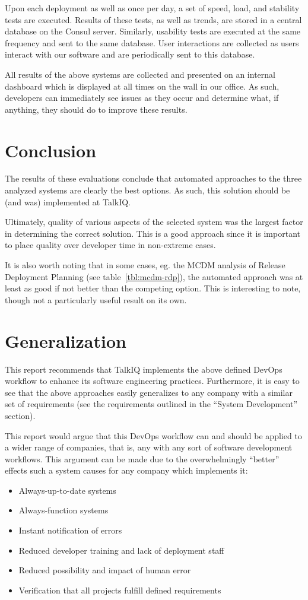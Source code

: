 \documentclass[12pt]{article}
\begin{document}
Upon each deployment as well as once per day, a set of speed, load, and stability tests are executed. Results of these tests, as well as trends, are stored in a central database on the Consul server. Similarly, usability tests are executed at the same frequency and sent to the same database. User interactions are collected as users interact with our software and are periodically sent to this database.

All results of the above systems are collected and presented on an internal dashboard which is displayed at all times on the wall in our office. As such, developers can immediately see issues as they occur and determine what, if anything, they should do to improve these results.
\newpage


\section{Conclusion}
The results of these evaluations conclude that automated approaches to the three analyzed systems are clearly the best options. As such, this solution should be (and was) implemented at TalkIQ.

Ultimately, quality of various aspects of the selected system was the largest factor in determining the correct solution. This is a good approach since it is important to place quality over developer time in non-extreme cases.

It is also worth noting that in some cases, eg. the MCDM analysis of Release Deployment Planning (see table~\ref{tbl:mcdm-rdp}), the automated approach was at least as good if not better than the competing option. This is interesting to note, though not a particularly useful result on its own.
\newpage


\section{Generalization}
This report recommends that TalkIQ implements the above defined DevOps workflow to enhance its software engineering practices. Furthermore, it is easy to see that the above approaches easily generalizes to any company with a similar set of requirements (see the requirements outlined in the ``System Development'' section).

This report would argue that this DevOps workflow can and should be applied to a wider range of companies, that is, any with any sort of software development workflows. This argument can be made due to the overwhelmingly ``better'' effects such a system causes for any company which implements it:
\begin{itemize}
\item Always-up-to-date systems
\item Always-function systems
\item Instant notification of errors
\item Reduced developer training and lack of deployment staff
\item Reduced possibility and impact of human error
\item Verification that all projects fulfill defined requirements
\end{itemize}
\end{document}
